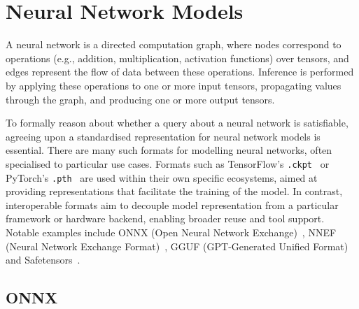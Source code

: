 \chapter{Neural Network Models}
\label{sec:models}
%
A neural network is a directed computation graph, where nodes correspond to operations (e.g., addition, multiplication, activation functions) over tensors, and edges represent the flow of data between these operations.
Inference is performed by applying these operations to one or more input tensors, propagating values through the graph, and producing one or more output tensors.

To formally reason about whether a query about a neural network is satisfiable, agreeing upon a standardised representation for neural network models is essential.
There are many such formats for modelling neural networks, often specialised to particular use cases. 
Formats such as TensorFlow’s \texttt{.ckpt}~\cite{Abadi_TensorFlow_Large_scale_machine_2015} or PyTorch’s \texttt{.pth}~\cite{Ansel_PyTorch_2_Faster_2024} are used within their own specific ecosystems, aimed at providing representations that facilitate the training of the model. 
In contrast, interoperable formats aim to decouple model representation from a particular framework or hardware backend, enabling broader reuse and tool support. 
Notable examples include ONNX (Open Neural Network Exchange)~\cite{onnxruntime}, NNEF (Neural Network Exchange Format)~\cite{nnef}, GGUF (GPT-Generated Unified Format)~\cite{gguf} and Safetensors~\cite{safetensors}.

\section{ONNX}
\label{sec:onnx}

